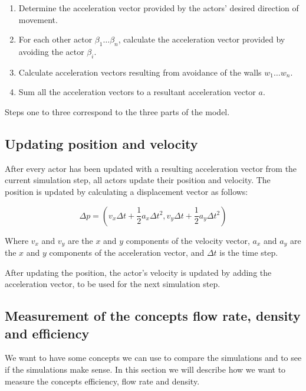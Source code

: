 \begin{enumerate}
    \item Determine the acceleration vector provided by the actors' desired 
        direction of movement.
    \item For each other actor $\beta_1\dots\beta_n$, calculate the 
        acceleration vector provided by avoiding the actor $\beta_i$.
    \item Calculate acceleration vectors resulting from avoidance of the walls 
        $w_1\dots w_n$.
    \item Sum all the acceleration vectors to a resultant acceleration vector 
        $a$.
\end{enumerate}

Steps one to three correspond to the three parts of the model.

\subsection{Updating position and velocity}
After every actor has been updated with a resulting acceleration vector from 
the current simulation step, all actors update their position and velocity.  
The position is updated by calculating a displacement vector as follows:

\begin{equation}
    \Delta p = (v_x \Delta t + \frac{1}{2}a_x \Delta t^2, v_y \Delta t + 
    \frac{1}{2}a_y \Delta t^2)
\end{equation}

Where $v_x$ and $v_y$ are the $x$ and $y$ components of the velocity vector, 
$a_x$ and $a_y$ are the $x$ and $y$ components of the acceleration vector, and 
$\Delta t$ is the time step.

After updating the position, the actor's velocity is updated by adding the 
acceleration vector, to be used for the next simulation step.

%
%
%
%
%
%
%

\subsection{Measurement of the concepts flow rate, density and efficiency}
We want to have some concepts we can use to compare the simulations and to see 
if the simulations make sense.  In this section we will describe how we want 
to measure the concepts efficiency, flow rate and density.

